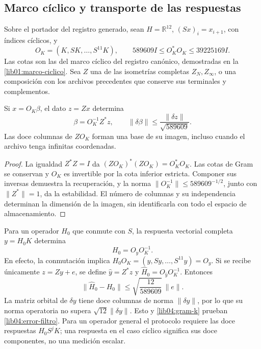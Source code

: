 \subsection{Marco cíclico y transporte de las respuestas}
\label{lib04:marco}

Sobre el portador del registro generado, sean
\(H=\mathbb R^{12}\), \((Sx)_i=x_{i+1}\), con índices cíclicos,
y
\begin{equation}
 O_K=(K,SK,\ldots,S^{11}K),\qquad
 589609I\leq O_K^*O_K\leq39225169I.
 \label{lib04:gram-k}
\end{equation}
Las cotas son las del marco cíclico del registro canónico,
demostradas en la \cref{lib01:marco-ciclico}.
Sea \(Z\) una de las isometrías completas
\(Z_N,Z_\infty\), o una composición con los archivos precedentes
que conserve sus terminales y complementos.

\begin{theorem}
\label{lib04:teo-marco}
Si \(x=O_K\beta\), el dato \(z=Zx\) determina
\begin{equation}
 \beta=O_K^{-1}Z^*z,\qquad
 \|\delta\beta\|\leq\frac{\|\delta z\|}{\sqrt{589609}}.
 \label{lib04:inversa-marco}
\end{equation}
Las doce columnas de \(ZO_K\) forman una base de su imagen, incluso
cuando el archivo tenga infinitas coordenadas.
\end{theorem}

\begin{proof}
La igualdad \(Z^*Z=I\) da
\((ZO_K)^*(ZO_K)=O_K^*O_K\). Las cotas de Gram se conservan y
\(O_K\) es invertible por la cota inferior estricta. Componer sus
inversas demuestra la recuperación, y la norma
\(\|O_K^{-1}\|\leq589609^{-1/2}\), junto con
\(\|Z^*\|=1\), da la estabilidad. El número de columnas y su
independencia determinan la dimensión de la imagen, sin identificarla
con todo el espacio de almacenamiento.
\end{proof}

Para un operador \(H_0\) que conmute con \(S\), la respuesta
vectorial completa \(y=H_0K\) determina
\begin{equation}
 H_0=O_yO_K^{-1}.
 \label{lib04:identificacion-filtro}
\end{equation}
En efecto, la conmutación implica
\(H_0O_K=(y,Sy,\ldots,S^{11}y)=O_y\). Si se recibe únicamente
\(z=Zy+e\), se define \(\widehat y=Z^*z\) y
\(\widehat H_0=O_{\widehat y}O_K^{-1}\). Entonces
\begin{equation}
 \|\widehat H_0-H_0\|
 \leq\sqrt{\frac{12}{589609}}\,\|e\|.
 \label{lib04:error-filtro}
\end{equation}
La matriz orbital de \(\delta y\) tiene doce columnas de norma
\(\|\delta y\|\), por lo que su norma operatoria no supera
\(\sqrt{12}\|\delta y\|\). Esto y
\eqref{lib04:gram-k} prueban \eqref{lib04:error-filtro}.
Para un operador general el protocolo requiere las doce respuestas
\(H_0S^jK\); una respuesta en el caso cíclico significa sus doce
componentes, no una medición escalar.

